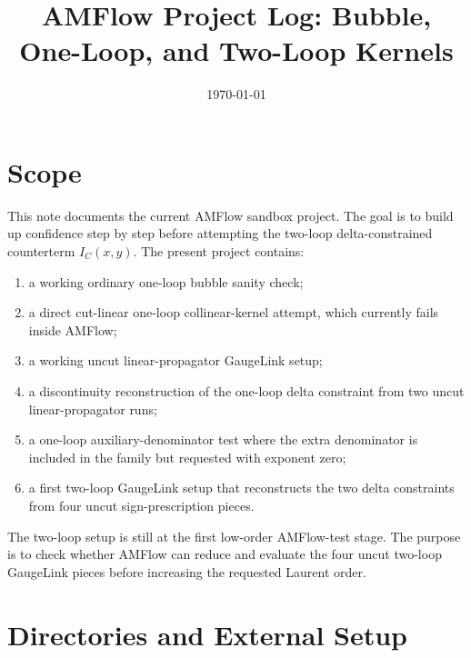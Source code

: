 \documentclass[11pt]{article}
\title{AMFlow Project Log: Bubble, One-Loop, and Two-Loop Kernels}
\author{}
\date{\today}
\begin{document}
\maketitle

\section{Scope}

This note documents the current AMFlow sandbox project. The goal is to build
up confidence step by step before attempting the two-loop delta-constrained
counterterm \(I_C(x,y)\). The present project contains:
\begin{enumerate}
  \item a working ordinary one-loop bubble sanity check;
  \item a direct cut-linear one-loop collinear-kernel attempt, which currently
        fails inside AMFlow;
  \item a working uncut linear-propagator GaugeLink setup;
  \item a discontinuity reconstruction of the one-loop delta constraint from
        two uncut linear-propagator runs;
  \item a one-loop auxiliary-denominator test where the extra denominator is
        included in the family but requested with exponent zero;
  \item a first two-loop GaugeLink setup that reconstructs the two delta
        constraints from four uncut sign-prescription pieces.
\end{enumerate}
The two-loop setup is still at the first low-order AMFlow-test stage. The
purpose is to check whether AMFlow can reduce and evaluate the four uncut
two-loop GaugeLink pieces before increasing the requested Laurent order.

\section{Directories and External Setup}
\end{document}
